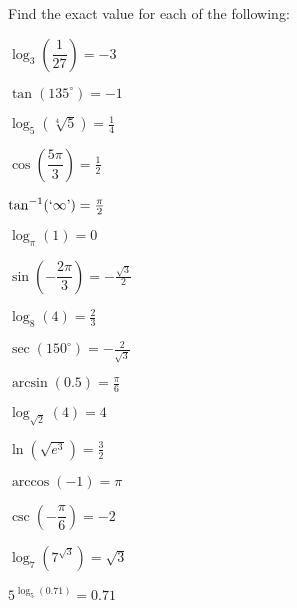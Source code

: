 \documentclass[12pt,letterpaper]{exam}
\newenvironment{2enumerate}{%
\begin{enumerate}[(a)]
\begin{multicols}{2}
}{%
\end{multicols}
\end{enumerate}
}
\begin{document}
\begin{questions}
Find the exact value for each of the following: \par\vspace{0.3cm}
	\begin{2enumerate}
	\item $\log_3 \!\left( \dfrac{1}{27} \right)= -3$ \par\vspace{1.8cm}
	\item $\tan(135^\circ)= -1$ \par\vspace{1.8cm}
	\item $\log_5 \left( \sqrt[4]{5} \right)= \frac{1}{4}$ \par\vspace{1.8cm}
	\item $\cos \!\left( \dfrac{5\pi}{3} \right)= \frac{1}{2}$ \par\vspace{1.8cm}
	\item $\tan^{-1}(`\infty\text{'})= \frac{\pi}{2}$ \par\vspace{1.8cm}
	\item $\log_\pi (1)= 0$ \par\vspace{1.8cm}
	\item $\sin \!\left(-\dfrac{2\pi}{3} \right)= -\frac{\sqrt{3}}{2}$ \par\vspace{1.8cm}
	\item $\log_8 (4)= \frac{2}{3}$ \par\vspace{1.8cm}
	\item $\sec(150^\circ)= -\frac{2}{\sqrt{3}}$ \par\vspace{1.8cm}
	\item $\arcsin(0.5)= \frac{\pi}{6}$ \par\vspace{1.8cm}
	\item $\log_{\sqrt{2}}(4)= 4$ \par\vspace{1.8cm}
	\item $\ln(\sqrt{e^3})= \frac{3}{2}$ \par\vspace{1.8cm}
	\item $\arccos(-1)= \pi$ \par\vspace{1.8cm}
	\item $\csc \!\left( -\dfrac{\pi}{6} \right)= -2$ \par\vspace{1.8cm}
	\item $\log_7(7^{\sqrt{3}})= \sqrt{3}$ \par\vspace{1.8cm}
	\item $5^{\log_5(0.71)}= 0.71$ \par\vspace{1.8cm}
	\end{2enumerate}




\end{questions}
\end{document}
